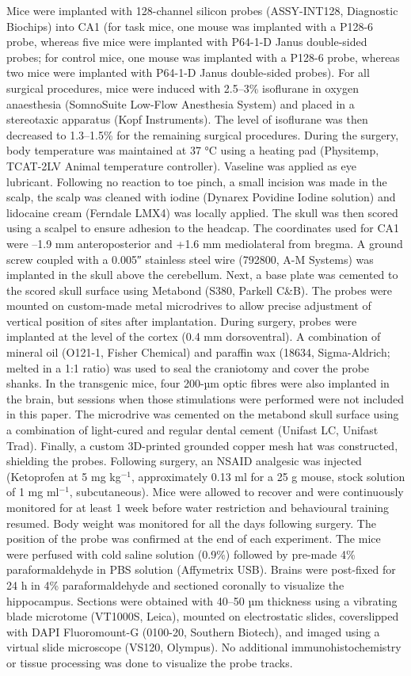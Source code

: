 Mice were implanted with 128-channel silicon probes (ASSY-INT128, Diagnostic Biochips) into CA1 (for task mice, one mouse was implanted with a P128-6 probe, whereas five mice were implanted with P64-1-D Janus double-sided probes; for control mice, one mouse was implanted with a P128-6 probe, whereas two mice were implanted with P64-1-D Janus double-sided probes). For all surgical procedures, mice were induced with 2.5--3\% isoflurane in oxygen anaesthesia (SomnoSuite Low-Flow Anesthesia System) and placed in a stereotaxic apparatus (Kopf Instruments). The level of isoflurane was then decreased to 1.3--1.5\% for the remaining surgical procedures. During the surgery, body temperature was maintained at 37 °C using a heating pad (Physitemp, TCAT-2LV Animal temperature controller). Vaseline was applied as eye lubricant. Following no reaction to toe pinch, a small incision was made in the scalp, the scalp was cleaned with iodine (Dynarex Povidine Iodine solution) and lidocaine cream (Ferndale LMX4) was locally applied. The skull was then scored using a scalpel to ensure adhesion to the headcap. The coordinates used for CA1 were --1.9 mm anteroposterior and +1.6 mm mediolateral from bregma. A ground screw coupled with a 0.005″ stainless steel wire (792800, A-M Systems) was implanted in the skull above the cerebellum. Next, a base plate was cemented to the scored skull surface using Metabond (S380, Parkell C\&B). The probes were mounted on custom-made metal microdrives to allow precise adjustment of vertical position of sites after implantation. During surgery, probes were implanted at the level of the cortex (0.4 mm dorsoventral). A combination of mineral oil (O121-1, Fisher Chemical) and paraffin wax (18634, Sigma-Aldrich; melted in a 1:1 ratio) was used to seal the craniotomy and cover the probe shanks. In the transgenic mice, four 200-µm optic fibres were also implanted in the brain, but sessions when those stimulations were performed were not included in this paper. The microdrive was cemented on the metabond skull surface using a combination of light-cured and regular dental cement (Unifast LC, Unifast Trad). Finally, a custom 3D-printed grounded copper mesh hat was constructed, shielding the probes. Following surgery, an NSAID analgesic was injected (Ketoprofen at 5 mg kg$^{-1}$, approximately 0.13 ml for a 25 g mouse, stock solution of 1 mg ml$^{-1}$, subcutaneous). Mice were allowed to recover and were continuously monitored for at least 1 week before water restriction and behavioural training resumed. Body weight was monitored for all the days following surgery. The position of the probe was confirmed at the end of each experiment. The mice were perfused with cold saline solution (0.9\%) followed by pre-made 4\% paraformaldehyde in PBS solution (Affymetrix USB). Brains were post-fixed for 24 h in 4\% paraformaldehyde and sectioned coronally to visualize the hippocampus. Sections were obtained with 40--50 µm thickness using a vibrating blade microtome (VT1000S, Leica), mounted on electrostatic slides, coverslipped with DAPI Fluoromount-G (0100-20, Southern Biotech), and imaged using a virtual slide microscope (VS120, Olympus). No additional immunohistochemistry or tissue processing was done to visualize the probe tracks.

